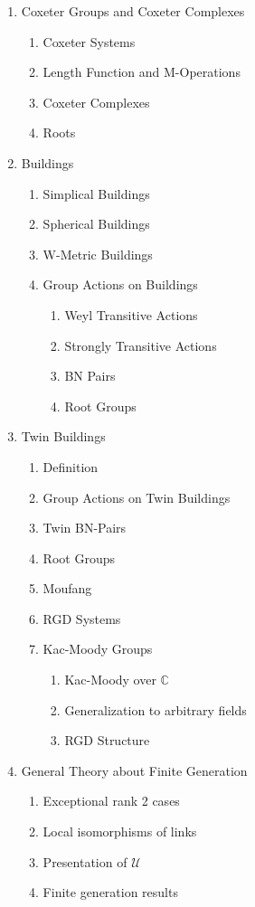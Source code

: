 \documentclass[12pt]{article}
\date{}
\newcommand{\C}{\ensuremath{\mathbb{C}}}
\begin{document}
\begin{enumerate}
	\item Coxeter Groups and Coxeter Complexes
	\begin{enumerate}
		\item Coxeter Systems
		\item Length Function and M-Operations
		\item Coxeter Complexes
		\item Roots
	\end{enumerate}
		
		
	\item Buildings
	\begin{enumerate}
		\item Simplical Buildings
		\item Spherical Buildings
		\item W-Metric Buildings
		\item Group Actions on Buildings
		\begin{enumerate}
			\item Weyl Transitive Actions
			\item Strongly Transitive Actions
			\item BN Pairs
			\item Root Groups
		\end{enumerate}
	\end{enumerate}
			

	\item Twin Buildings
		\begin{enumerate}
			\item Definition
			\item Group Actions on Twin Buildings
			\item Twin BN-Pairs
			\item Root Groups
			\item Moufang
			\item RGD Systems
			\item Kac-Moody Groups
			\begin{enumerate}
				\item Kac-Moody over $\C$
				\item Generalization to arbitrary fields
				\item RGD Structure
			\end{enumerate}
	\end{enumerate}

	\item General Theory about Finite Generation
		\begin{enumerate}
			\item Exceptional rank 2 cases
			\item Local isomorphisms of links
			\item Presentation of $\mathcal{U}$
			\item Finite generation results
		\end{enumerate}


\end{enumerate}
\end{document}
